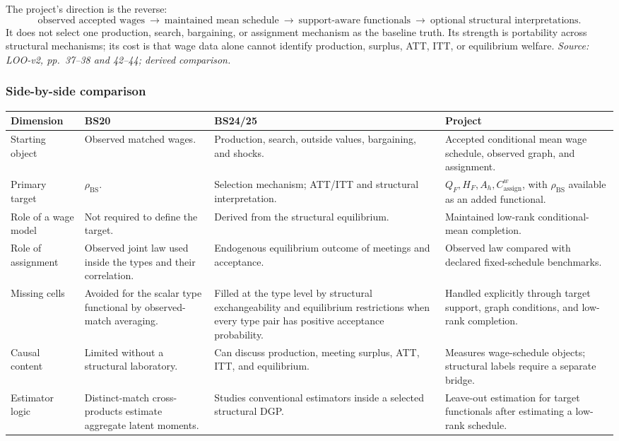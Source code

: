 \documentclass[11pt]{article}
\begin{document}
The project's direction is the reverse:
\[
\text{observed accepted wages}
\ \longrightarrow\
\text{maintained mean schedule}
\ \longrightarrow\
\text{support-aware functionals}
\ \longrightarrow\
\text{optional structural interpretations}.
\tag{T3.77}
\]
It does not select one production, search, bargaining, or assignment mechanism
as the baseline truth.  Its strength is portability across structural
mechanisms; its cost is that wage data alone cannot identify production,
surplus, ATT, ITT, or equilibrium welfare.
\textit{Source: LOO-v2, pp.\ 37--38 and 42--44; derived comparison.}

\subsubsection{Side-by-side comparison}

\begin{longtable}{p{}p{}p{}p{}}
\textbf{Dimension} & \textbf{BS20} & \textbf{BS24/25} &
\textbf{Project} \\
\hline
Starting object &
Observed matched wages. &
Production, search, outside values, bargaining, and shocks. &
Accepted conditional mean wage schedule, observed graph, and assignment. \\
Primary target &
\(\rho_{\mathrm{BS}}\). &
Selection mechanism; ATT/ITT and structural interpretation. &
\(Q_F,H_F,A_h,C^w_{\mathrm{assign}}\), with
\(\rho_{\mathrm{BS}}\) available as an added functional. \\
Role of a wage model &
Not required to define the target. &
Derived from the structural equilibrium. &
Maintained low-rank conditional-mean completion. \\
Role of assignment &
Observed joint law used inside the types and their correlation. &
Endogenous equilibrium outcome of meetings and acceptance. &
Observed law compared with declared fixed-schedule benchmarks. \\
Missing cells &
Avoided for the scalar type functional by observed-match averaging. &
Filled at the type level by structural exchangeability and equilibrium
restrictions when every type pair has positive acceptance probability. &
Handled explicitly through target support, graph conditions, and low-rank
completion. \\
Causal content &
Limited without a structural laboratory. &
Can discuss production, meeting surplus, ATT, ITT, and equilibrium. &
Measures wage-schedule objects; structural labels require a separate bridge. \\
Estimator logic &
Distinct-match cross-products estimate aggregate latent moments. &
Studies conventional estimators inside a selected structural DGP. &
Leave-out estimation for target functionals after estimating a low-rank
schedule. \\
\end{longtable}
\end{document}
